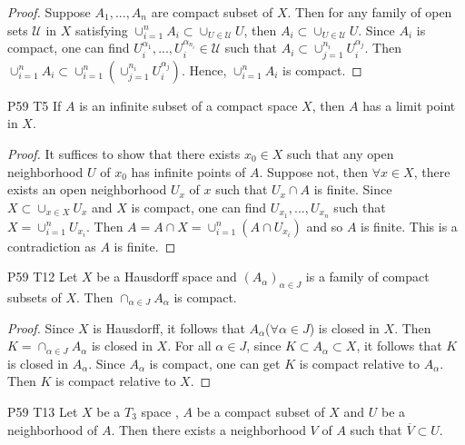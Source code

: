 \begin{proof}
    Suppose $A_1,...,A_n$ are compact subset of $X$. Then for any family of open sets $\mathcal{U}$ in $X$ satisfying $\cup_{i=1}^{n}A_i\subset \cup_{U\in \mathcal{U}} U$,
    then $A_i\subset \cup_{U\in \mathcal{U}} U$. Since $A_i$ is compact, one can find $U_{i}^{\alpha_1},...,U_{i}^{\alpha_{n_i}}\in \mathcal{U}$ such that $A_i\subset \cup_{j=1}^{n_i} U_{i}^{\alpha_j}$.
    Then $\cup_{i=1}^n A_i\subset\cup_{i=1}^{n}(\cup_{j=1}^{n_i}U_i^{\alpha_j})$. Hence, $\cup_{i=1}^{n} A_i$ is compact.
\end{proof}


\begin{exercise}{P59 T5}{}
    If $A$ is an infinite subset of a compact space $X$, then $A$
    has a limit point in $X$.
\end{exercise}


\begin{proof}
    It suffices to show that there exists $x_0\in X$ such that any open neighborhood $U$ of $x_0$ has infinite points of $A$.
    Suppose not, then $\forall x\in X$, there exists an open neighborhood $U_x$ of $x$ such that $U_x\cap A$ is finite. 
    Since $X\subset \cup_{x\in X} U_x$ and $X$ is compact, one can find $U_{x_1},...,U_{x_n}$ such that $X=\cup_{i=1}^{n}U_{x_i}$.
    Then $A=A\cap X=\cup_{i=1}^{n}(A\cap U_{x_i})$ and so $A$ is finite. This is a contradiction as $A$ is finite.
\end{proof}

\begin{exercise}{P59 T12}{}
    Let $X$ be a Hausdorff space and $(A_{\alpha})_{\alpha\in J}$ is a family of compact subsets of $X$.
    Then $\cap_{\alpha\in J}A_{\alpha}$ is compact.
\end{exercise}

\begin{proof}
    Since $X$ is Hausdorff, it follows that $A_{\alpha}$($\forall \alpha\in J$) is closed in $X$. 
    Then $K=\cap_{\alpha\in J}A_{\alpha}$ is closed in $X$. For all $\alpha\in J$, since $K\subset A_{\alpha} \subset X$, 
    it follows that $K$ is closed in $A_{\alpha}$. Since $A_{\alpha}$ is compact, one can get $K$ is compact relative to $A_{\alpha}$.
    Then $K$ is compact relative to $X$.
\end{proof}

\begin{exercise}{P59 T13}{}
    Let $X$ be a $T_3$ space , $A$ be a compact subset of $X$
    and $U$ be a neighborhood of $A$. 
    Then there exists a neighborhood $V$ of $A$ such that $\overline{V}\subset U$.
\end{exercise}

